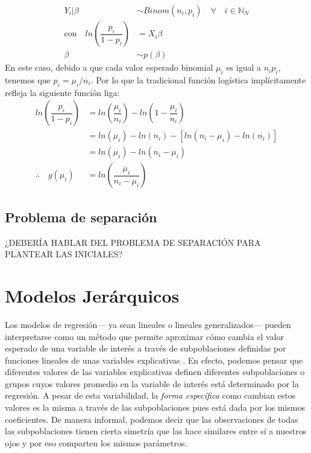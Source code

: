 \begin{align} \label{eq:MLG_Binom}
Y_i|\beta & \sim Binom(n_i,p_i) \quad \forall \quad i \in \mathbb{N}_N \nonumber \\
\text{con} \quad ln\left(\dfrac{p_i}{1-p_i}\right) &= X_i\beta \nonumber \\
\beta &\sim p(\beta)
\end{align}
En este caso, debido a que cada valor esperado binomial $\mu_i$ es igual a $n_ip_i$, tenemos que $p_i=\mu_i/n_i$. Por lo que la tradicional función logística implícitamente refleja la siguiente función liga: 
\begin{align*}
ln\left(\dfrac{p_i}{1-p_i}\right) &= ln\left(\dfrac{\mu_i}{n_i}\right)-ln\left(1-\dfrac{\mu_i}{n_i}\right)\\ 
&= ln\left(\mu_i\right)-ln\left(n_i\right)-\left[ln\left(n_i-\mu_i\right)-ln\left(n_i\right)\right]\\ 
&= ln\left(\mu_i\right)-ln\left(n_i-\mu_i\right)\\ 
\therefore \quad g(\mu_i)&=ln\left(\dfrac{\mu_i}{n_i-\mu_i}\right)
\end{align*}

\subsection{Problema de separación}

{\color{Red} ¿DEBERÍA HABLAR DEL PROBLEMA DE SEPARACIÓN PARA PLANTEAR LAS INICIALES?}

\section{Modelos Jerárquicos}

Los modelos de regresión--- ya sean lineales o lineales generalizados--- pueden interpretarse como un método que permite aproximar cómo cambia el valor esperado de una variable de interés a través de subpoblaciones definidas por funciones lineales de unas variables explicativas \parencite[31]{GelmanHill06}. En efecto, podemos pensar que diferentes valores de las variables explicativas definen diferentes subpoblaciones o grupos cuyos valores promedio en la variable de interés está determinado por la regresión. A pesar de esta variabilidad, la \textit{forma específica} como cambian estos valores es la misma a través de las subpoblaciones pues está dada por los mismos coeficientes. De manera informal, podemos decir que las observaciones de todas las subpoblaciones tienen cierta simetría que las hace similares entre sí a nuestros ojos y por eso comparten los mismos parámetros.\\ 

